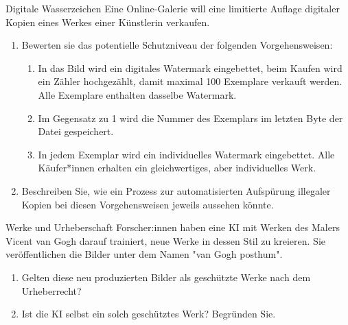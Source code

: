 \documentclass{article}
\begin{document}
\begin{exercise}{Digitale Wasserzeichen}
  Eine Online-Galerie will eine limitierte Auflage digitaler Kopien eines Werkes einer Künstlerin verkaufen.
  \begin{enumerate}
    \item Bewerten sie das potentielle Schutzniveau der folgenden Vorgehensweisen:
          \begin{enumerate}
            \item In das Bild wird ein digitales Watermark eingebettet, beim Kaufen wird ein Zähler hochgezählt, damit maximal 100 Exemplare verkauft werden. Alle Exemplare enthalten dasselbe Watermark.
            \item Im Gegensatz zu 1 wird die Nummer des Exemplars im letzten Byte der Datei gespeichert.
            \item In jedem Exemplar wird ein individuelles Watermark eingebettet. Alle Käufer*innen erhalten ein gleichwertiges, aber individuelles Werk.
          \end{enumerate}
    \item Beschreiben Sie, wie ein Prozess zur automatisierten Aufspürung illegaler Kopien bei diesen Vorgehensweisen jeweils aussehen könnte.
  \end{enumerate}
\end{exercise}



\begin{exercise}{Werke und Urheberschaft}
  Forscher:innen haben eine KI mit Werken des Malers Vicent van Gogh darauf trainiert, neue Werke in dessen Stil zu kreieren. Sie veröffentlichen die Bilder unter dem Namen "van Gogh posthum".
  \begin{enumerate}
    \item Gelten diese neu produzierten Bilder als geschützte Werke nach dem Urheberrecht?
    \item Ist die KI selbst ein solch geschütztes Werk? Begründen Sie.
  \end{enumerate}
\end{exercise}
\end{document}
